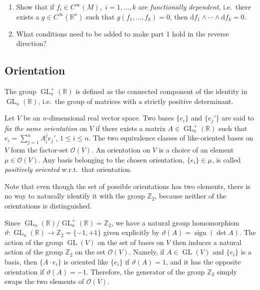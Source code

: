 \documentclass[english,letterpaper]{article}%
\numberwithin{equation}{section}
\numberwithin{figure}{section}
\numberwithin{table}{section}
\theoremstyle{definition}
\theoremstyle{definition}
\theoremstyle{definition}
\theoremstyle{plain}
\theoremstyle{plain}
\theoremstyle{plain}
\theoremstyle{plain}
\theoremstyle{remark}
\theoremstyle{remark}
\newcommand{\dd}{{\mathrm{d}}}
\renewcommand{\leq}{\leqslant}
\DeclareMathOperator{\sign}{sign}
\DeclareMathOperator{\GL}{GL}
\begin{document}
\begin{xca}
    \begin{enumerate}
        \item Show that if $f_i\in C^\infty(M),$ $i=1,\ldots,k$ are \emph{functionally dependent}, i.e.\ there exists a $g\in C^\infty(\mathbb{R}^n)$ such that $g(f_1,\ldots,f_k)=0$, then $\dd f_1\wedge\cdots\wedge \dd f_k=0$.
        \item What conditions need to be added to make part 1 hold in the reverse direction?
    \end{enumerate}
\end{xca}




\subsection{Orientation}

The group $\GL^+_n(\mathbb{R})$ is defined as the connected component of the identity in $\GL_n(\mathbb{R})$, i.e.\ the group of matrices with a strictly positive determinant.

\begin{defn}
Let $V$ be an $n$-dimensional real vector space. Two bases $\{e_i\}$ and $\{e_j'\}$ are said to \emph{fix the same orientation} on $V$ if there exists a matrix $A\in\GL^+_n(\mathbb{R})$ such that $e_i=\sum_{j=1}^n A_i^j e_j'$, $1\leq i\leq n$. The two equivalence classes of like-oriented bases on $V$ form the factor-set $\mathcal{O}(V)$. An orientation on $V$ is a choice of an element $\mu\in\mathcal{O}(V)$. Any basis belonging to the chosen orientation, $\{e_i\}\in\mu$, is called \emph{positively oriented} w.r.t.\ that orientation.
\end{defn}

Note that even though the set of possible orientations has two elements, there is no way to naturally identify it with the group $\mathbb{Z}_2$, because neither of the orientations is distinguished.

Since $\GL_n(\mathbb{R})/\GL^+_n(\mathbb{R})=\mathbb{Z}_2$, we have a natural group homomorphism $\vartheta:\GL_n(\mathbb{R})\to \mathbb{Z}_2=\{-1,+1\}$ given explicitly by $\vartheta(A)=\sign (\det A)$. The action of the group $\GL(V)$ on the set of bases on $V$ then induces a natural action of the group $\mathbb{Z}_2$ on the set $\mathcal{O}(V)$. Namely, if $A\in\GL(V)$ and $\{e_i\}$ is a basis, then $\{A\cdot e_i\}$ is oriented like $\{e_i\}$ if $\vartheta(A)=1$, and it has the opposite orientation if $\vartheta(A)=-1$. Therefore, the generator of the group $\mathbb{Z}_2$ simply swaps the two elements of $\mathcal{O}(V)$.
\end{document}

